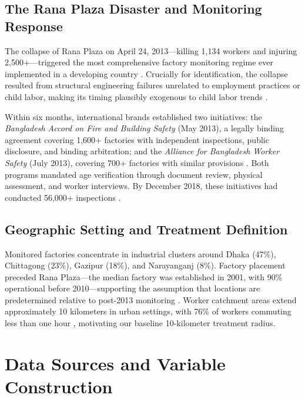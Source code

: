 \documentclass[12pt]{article}
\begin{document}
\subsection{The Rana Plaza Disaster and Monitoring Response}

The collapse of Rana Plaza on April 24, 2013---killing 1,134 workers and injuring 2,500+---triggered the most comprehensive factory monitoring regime ever implemented in a developing country \citep{reinecke2018challenge, barrett2018garment}. Crucially for identification, the collapse resulted from structural engineering failures unrelated to employment practices or child labor, making its timing plausibly exogenous to child labor trends \citep{labowitz2015business}.

Within six months, international brands established two initiatives: the \textit{Bangladesh Accord on Fire and Building Safety} (May 2013), a legally binding agreement covering 1,600+ factories with independent inspections, public disclosure, and binding arbitration; and the \textit{Alliance for Bangladesh Worker Safety} (July 2013), covering 700+ factories with similar provisions \citep{donaghey2014reinventing}. Both programs mandated age verification through document review, physical assessment, and worker interviews. By December 2018, these initiatives had conducted 56,000+ inspections \cite{accord2018final, alliance2018final}.

\subsection{Geographic Setting and Treatment Definition}

Monitored factories concentrate in industrial clusters around Dhaka (47\%), Chittagong (23\%), Gazipur (18\%), and Narayanganj (8\%). Factory placement preceded Rana Plaza---the median factory was established in 2001, with 90\% operational before 2010---supporting the assumption that locations are predetermined relative to post-2013 monitoring \cite{zhang2014infrastructure}. Worker catchment areas extend approximately 10 kilometers in urban settings, with 76\% of workers commuting less than one hour \citep{heath2018manufacturing, blum2023factories}, motivating our baseline 10-kilometer treatment radius.

\section{Data Sources and Variable Construction}
\end{document}
